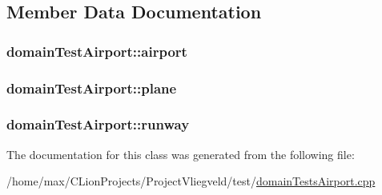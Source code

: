 \subsection{Member Data Documentation}
\subsubsection[{\texorpdfstring{airport}{airport}}]{ domain\+Test\+Airport\+::airport\hspace{0.3cm}{\ttfamily [protected]}}\hypertarget{classdomainTestAirport_afa24e8a08b5107bc45c9188eb914803c}{}\label{classdomainTestAirport_afa24e8a08b5107bc45c9188eb914803c}
\subsubsection[{\texorpdfstring{plane}{plane}}]{ domain\+Test\+Airport\+::plane\hspace{0.3cm}{\ttfamily [protected]}}\hypertarget{classdomainTestAirport_af38b399f44ab9ed6d563f8c008bc1986}{}\label{classdomainTestAirport_af38b399f44ab9ed6d563f8c008bc1986}
\subsubsection[{\texorpdfstring{runway}{runway}}]{ domain\+Test\+Airport\+::runway\hspace{0.3cm}{\ttfamily [protected]}}\hypertarget{classdomainTestAirport_a0d88cd4618213d454a565d95b5b6c5db}{}\label{classdomainTestAirport_a0d88cd4618213d454a565d95b5b6c5db}


The documentation for this class was generated from the following file\+:\begin{DoxyCompactItemize}
\item 
/home/max/\+C\+Lion\+Projects/\+Project\+Vliegveld/test/\hyperlink{domainTestsAirport_8cpp}{domain\+Tests\+Airport.\+cpp}\end{DoxyCompactItemize}
